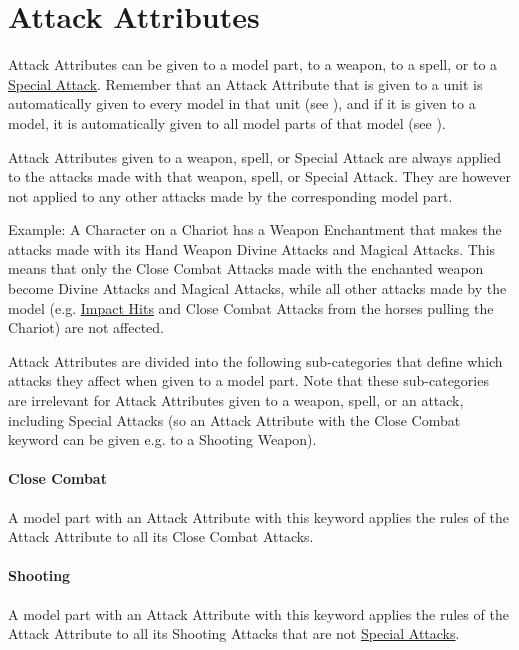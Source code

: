 \section{Attack Attributes}
\label{attack_attributes}

Attack Attributes can be given to a model part, to a weapon, to a spell, or to a \hyperref[special_attacks]{Special Attack}. Remember that an Attack Attribute that is given to a unit is automatically given to every model in that unit (see ), and if it is given to a model, it is automatically given to all model parts of that model (see ).

Attack Attributes given to a weapon, spell, or Special Attack are always applied to the attacks made with that weapon, spell, or Special Attack. They are however not applied to any other attacks made by the corresponding model part.

Example: A Character on a Chariot has a Weapon Enchantment that makes the attacks made with its Hand Weapon Divine Attacks and Magical Attacks. This means that only the Close Combat Attacks made with the enchanted weapon become Divine Attacks and Magical Attacks, while all other attacks made by the model (e.g. \hyperref[impact_hits]{Impact Hits} and Close Combat Attacks from the horses pulling the Chariot) are not affected.

Attack Attributes are divided into the following sub-categories that define which attacks they affect when given to a model part. Note that these sub-categories are irrelevant for Attack Attributes given to a weapon, spell, or an attack, including Special Attacks (so an Attack Attribute with the Close Combat keyword can be given e.g. to a Shooting Weapon).

\paragraph{Close Combat}

A model part with an Attack Attribute with this keyword applies the rules of the Attack Attribute to all its Close Combat Attacks.

\paragraph{Shooting}

A model part with an Attack Attribute with this keyword applies the rules of the Attack Attribute to all its Shooting Attacks that are not \hyperref[special_attacks]{Special Attacks}.


